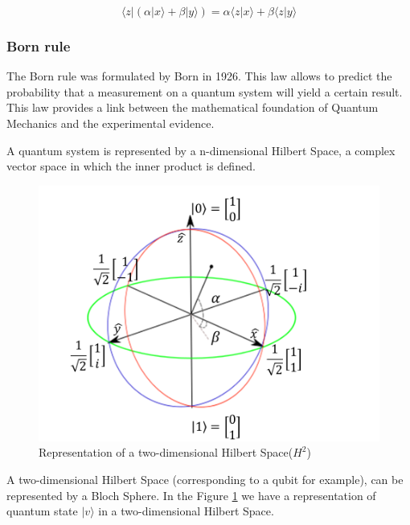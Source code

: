  

\begin{equation}
\label{eq_linearity}
\langle z\vert(\alpha\vert x\rangle+\beta\vert y\rangle)=\alpha\langle z\vert x\rangle+\beta\langle z\vert y\rangle
\end{equation}


\subsubsection{Born rule}

The Born rule was formulated by Born in 1926. This law allows to predict the probability that a measurement on a quantum system will yield a certain result. This law provides a link between the mathematical foundation of Quantum Mechanics and the experimental evidence\cite{VanRijsbergen2004}\cite{Landsman2009}. 

A quantum system is represented by a n-dimensional Hilbert Space, a complex vector space in which the inner product is defined. 




\begin{figure}[h]
\centering 

\includegraphics[scale=0.35]{Figures/bloch_sphere.png}
\caption{Representation of a two-dimensional Hilbert Space($H^{2}$)}
\label{fig:circle}
\end{figure}


A two-dimensional Hilbert Space (corresponding to a qubit for example), can be represented by a Bloch Sphere. In the Figure \ref{fig:circle} we have a representation of quantum state $\vert v \rangle$ in a two-dimensional Hilbert Space. 



